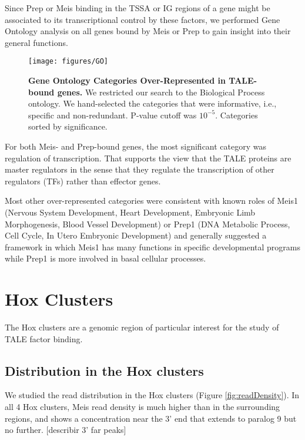 Since Prep or Meis binding in the \ac{TSSA} or \ac{IG} regions of a gene might be associated to its transcriptional control by these factors, we performed Gene Ontology analysis on all genes bound by Meis or Prep to gain insight into their general functions. 

\begin{SCfigure}[]
  \centering
  \texttt{[image: figures/GO]}
  \caption[Gene Ontology Categories Over-Represented in TALE-bound genes]{\textbf{Gene Ontology Categories Over-Represented in TALE-bound genes.} We restricted our search to the Biological Process ontology. We hand-selected the categories that were informative, i.e., specific and non-redundant. P-value cutoff was $10^{-5}$. Categories sorted by significance.}
  \label{fig:GO}
\end{SCfigure}

For both Meis- and Prep-bound genes, the most significant category was regulation of transcription. That supports the view that the \ac{TALE} proteins are master regulators in the sense that they regulate the transcription of other regulators (\acp{TF}) rather than effector genes. 

Most other over-represented categories were consistent with known roles of Meis1 (Nervous System Development, Heart Development, Embryonic Limb Morphogenesis, Blood Vessel Development) or Prep1 (DNA Metabolic Process, Cell Cycle, In Utero Embryonic Development) and generally suggested a framework in which Meis1 has many functions in specific developmental programs while Prep1 is more involved in basal cellular processes.


\section{Hox Clusters}

The Hox clusters are a genomic region of particular interest for the study of \ac{TALE} factor binding. 

\subsection{Distribution in the Hox clusters}

We studied the read distribution in the Hox clusters (Figure \ref{fig:readDensity}). In all 4 Hox clusters, Meis read density is much higher than in the surrounding regions, and shows a concentration near the 3' end that extends to paralog 9 but no further. [describir 3' far peaks]

